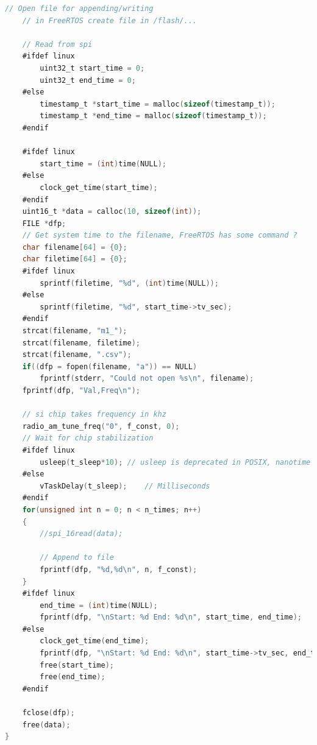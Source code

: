 \documentclass[english,12pt,a4paper,pdftex,elec,utf8]{aaltothesis}
\begin{document}
\begin{lstlisting}[language=C]
	// Open file for appending/writing
	// in FreeRTOS create file in /flash/...

	// Read from spi
	#ifdef linux
		uint32_t start_time = 0;
		uint32_t end_time = 0;
	#else
		timestamp_t *start_time = malloc(sizeof(timestamp_t));
		timestamp_t *end_time = malloc(sizeof(timestamp_t));
	#endif

	#ifdef linux
		start_time = (int)time(NULL);
	#else
		clock_get_time(start_time);
	#endif
	uint16_t *data = calloc(10, sizeof(int));
	FILE *dfp;
	// Get system time to the filename, FreeRTOS has some command ?
	char filename[64] = {0};
	char filetime[64] = {0};
	#ifdef linux
		sprintf(filetime, "%d", (int)time(NULL));
	#else
		sprintf(filetime, "%d", start_time->tv_sec);
	#endif	
	strcat(filename, "m1_");
	strcat(filename, filetime);
	strcat(filename, ".csv");
	if((dfp = fopen(filename, "a")) == NULL)
		fprintf(stderr, "Could not open %s\n", filename);
	fprintf(dfp, "Val,Freq\n");

	// si chip takes frequency in khz
	radio_am_tune_freq("0", f_const, 0);
	// Wait for chip stabilization
	#ifdef linux
		usleep(t_sleep*10);	// usleep is deprecated in POSIX, nanotime is preferred
	#else
		vTaskDelay(t_sleep);	// Milliseconds
	#endif
	for(unsigned int n = 0; n < n_times; n++)
	{
		//spi_16read(data);
		 
		// Append to file
		fprintf(dfp, "%d,%d\n", n, f_const);	
	}
	#ifdef linux
		end_time = (int)time(NULL);
		fprintf(dfp, "\nStart: %d End: %d\n", start_time, end_time);	
	#else
		clock_get_time(end_time);
		fprintf(dfp, "\nStart: %d End: %d\n", start_time->tv_sec, end_time->tv_sec);	
		free(start_time);
		free(end_time);
	#endif	

	fclose(dfp);	
	free(data);
} 
\end{lstlisting}



\clearpage
\end{document}
